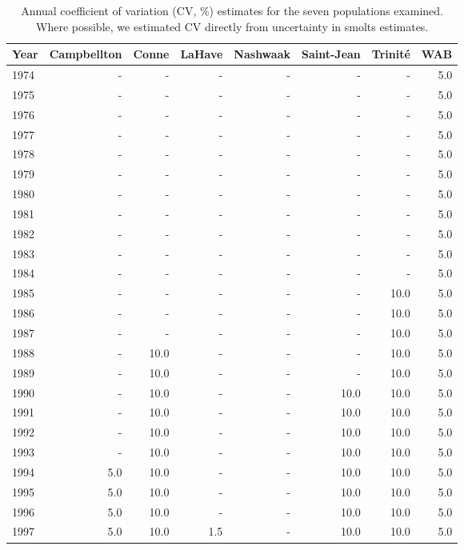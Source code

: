 \begingroup\footnotesize
\begin{longtable}{lrrrrrrr}
\caption{Annual coefficient of variation (CV, \%) estimates for the seven populations
                    examined. Where possible, we estimated CV directly
                    from uncertainty in smolts estimates.} \\ 
  \hline
Year & Campbellton & Conne & LaHave & Nashwaak & Saint-Jean & Trinité & WAB \\ 
  \hline
1974 & - & - & - & - & - & - & 5.0 \\ 
  1975 & - & - & - & - & - & - & 5.0 \\ 
  1976 & - & - & - & - & - & - & 5.0 \\ 
  1977 & - & - & - & - & - & - & 5.0 \\ 
  1978 & - & - & - & - & - & - & 5.0 \\ 
  1979 & - & - & - & - & - & - & 5.0 \\ 
  1980 & - & - & - & - & - & - & 5.0 \\ 
  1981 & - & - & - & - & - & - & 5.0 \\ 
  1982 & - & - & - & - & - & - & 5.0 \\ 
  1983 & - & - & - & - & - & - & 5.0 \\ 
  1984 & - & - & - & - & - & - & 5.0 \\ 
  1985 & - & - & - & - & - & 10.0 & 5.0 \\ 
  1986 & - & - & - & - & - & 10.0 & 5.0 \\ 
  1987 & - & - & - & - & - & 10.0 & 5.0 \\ 
  1988 & - & 10.0 & - & - & - & 10.0 & 5.0 \\ 
  1989 & - & 10.0 & - & - & - & 10.0 & 5.0 \\ 
  1990 & - & 10.0 & - & - & 10.0 & 10.0 & 5.0 \\ 
  1991 & - & 10.0 & - & - & 10.0 & 10.0 & 5.0 \\ 
  1992 & - & 10.0 & - & - & 10.0 & 10.0 & 5.0 \\ 
  1993 & - & 10.0 & - & - & 10.0 & 10.0 & 5.0 \\ 
  1994 & 5.0 & 10.0 & - & - & 10.0 & 10.0 & 5.0 \\ 
  1995 & 5.0 & 10.0 & - & - & 10.0 & 10.0 & 5.0 \\ 
  1996 & 5.0 & 10.0 & - & - & 10.0 & 10.0 & 5.0 \\ 
  1997 & 5.0 & 10.0 & 1.5 & - & 10.0 & 10.0 & 5.0 \\ 

\end{longtable}
